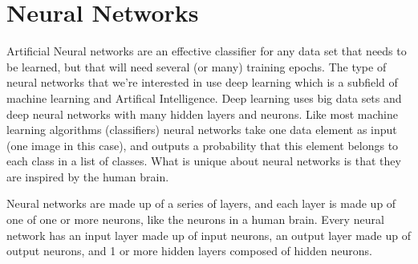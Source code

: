 \documentclass[12pt]{report} %
\begin{document}
\chapter{Neural Networks}
	
	Artificial Neural networks are an effective classifier for any data set that needs to be learned, but that will need several (or many) training epochs. The type of neural networks that we're interested in use deep learning which is a subfield of machine learning and Artifical Intelligence. Deep learning uses big data sets and deep neural networks with many hidden layers and neurons\cite{deepMachineMastry}. Like most machine learning algorithms (classifiers)  neural networks take one data element as input (one image in this case), and outputs a probability that this element belongs to each class in a list of classes. What is unique about neural networks is that they are inspired by the human brain. 
	
	Neural networks are made up of a series of layers, and each layer is made up of one of one or more neurons, like the neurons in a human brain. Every neural network has an input layer made up of input neurons, an output layer made up of output neurons, and 1 or more hidden layers composed of hidden neurons.
\end{document}
